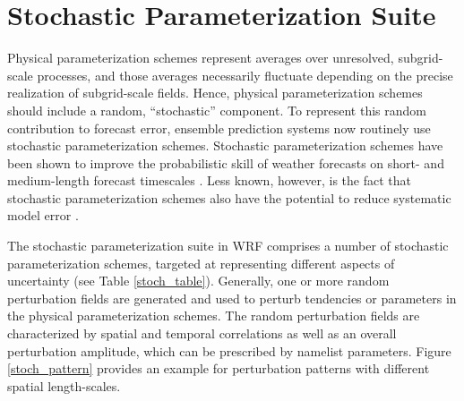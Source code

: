 \chapter{Stochastic Parameterization Suite}
\label{stoch}

Physical parameterization schemes represent averages over unresolved,
subgrid-scale processes, and those averages necessarily 
fluctuate depending on the precise realization of subgrid-scale
fields.  Hence, physical parameterization schemes should include a random,
``stochastic'' component.  To represent this random contribution to
forecast error, ensemble prediction systems now routinely use stochastic
parameterization schemes.
Stochastic parameterization schemes have been shown to improve the
probabilistic skill of weather forecasts on short- and medium-length forecast
timescales 
\citep[e.g.][]{Be09,Be11,leutbecher2017stochastic}.
Less known, however, is the fact that stochastic parameterization schemes also have the
potential to reduce systematic model error 
\citep[e.g.][]{berner2017stochastic}.

The stochastic parameterization suite in WRF comprises a number of
stochastic parameterization schemes, targeted at representing different aspects 
of uncertainty (see Table \ref {stoch_table}). Generally, one or more random
perturbation fields are generated and used to perturb tendencies or
parameters in the physical parameterization schemes.
The random perturbation fields are characterized by spatial and temporal
correlations as well as an overall perturbation amplitude, which can be
prescribed by namelist parameters. Figure \ref{stoch_pattern}
provides an example for perturbation patterns with different spatial length-scales.


